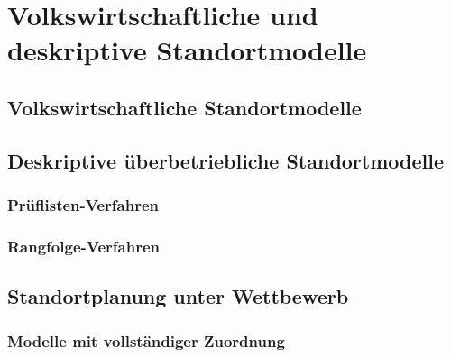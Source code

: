 \chapter{Volkswirtschaftliche und deskriptive Standortmodelle} %
\label{cha:volkswirtschaftliche_und_deskriptive_standortmodelle}

    \section{Volkswirtschaftliche Standortmodelle} %
    \label{sec:volkswirtschaftliche_standortmodelle}
    

    \section{Deskriptive überbetriebliche Standortmodelle} %
    \label{sec:deskriptive_berbetriebliche_standortmodelle}
    
      \subsection{Prüflisten-Verfahren} %
      \label{sub:pr_flisten_verfahren}
      

      \subsection{Rangfolge-Verfahren} %
      \label{sub:rangfolge_verfahren}
      


    \section{Standortplanung unter Wettbewerb} %
    \label{sec:standortplanung_unter_wettbewerb}

      \subsection{Modelle mit vollständiger Zuordnung} %
      \label{sub:modelle_mit_vollst_ndiger_zuordnung}
      


